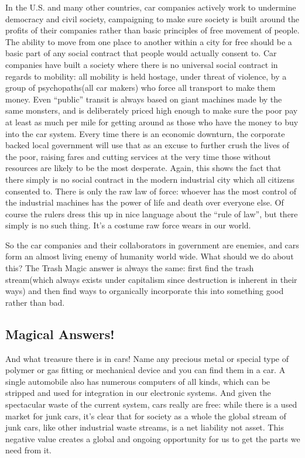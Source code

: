 In the U.S. and many other countries, car companies actively work to
undermine democracy and civil society, campaigning to make sure society
is built around the profits of their companies rather than basic
principles of free movement of people. The ability to move from one
place to another within a city for free should be a basic part of any
social contract that people would actually consent to. Car companies
have built a society where there is no universal social contract in
regards to mobility: all mobility is held hostage, under threat of
violence, by a group of psychopaths(all car makers) who force all
transport to make them money. Even ``public'' transit is always based on
giant machines made by the same monsters, and is deliberately priced
high enough to make sure the poor pay at least as much per mile for
getting around as those who have the money to buy into the car system.
Every time there is an economic downturn, the corporate backed local
government will use that as an excuse to further crush the lives of the
poor, raising fares and cutting services at the very time those without
resources are likely to be the most desperate. Again, this shows the
fact that there simply is no social contract in the modern industrial
city which all citizens consented to. There is only the raw law of
force: whoever has the most control of the industrial machines has the
power of life and death over everyone else. Of course the rulers dress
this up in nice language about the ``rule of law'', but there simply is
no such thing. It's a costume raw force wears in our world.

So the car companies and their collaborators in government are enemies,
and cars form an almost living enemy of humanity world wide. What should
we do about this? The Trash Magic answer is always the same: first find
the trash stream(which always exists under capitalism since destruction
is inherent in their ways) and then find ways to organically incorporate
this into something good rather than bad.

\subsection{Magical Answers!}\label{magical-answers}

And what treasure there is in cars! Name any precious metal or special
type of polymer or gas fitting or mechanical device and you can find
them in a car. A single automobile also has numerous computers of all
kinds, which can be stripped and used for integration in our electronic
systems. And given the spectacular waste of the current system, cars
really are free: while there is a used market for junk cars, it's clear
that for society as a whole the global stream of junk cars, like other
industrial waste streams, is a net liability not asset. This negative
value creates a global and ongoing opportunity for us to get the parts
we need from it.

